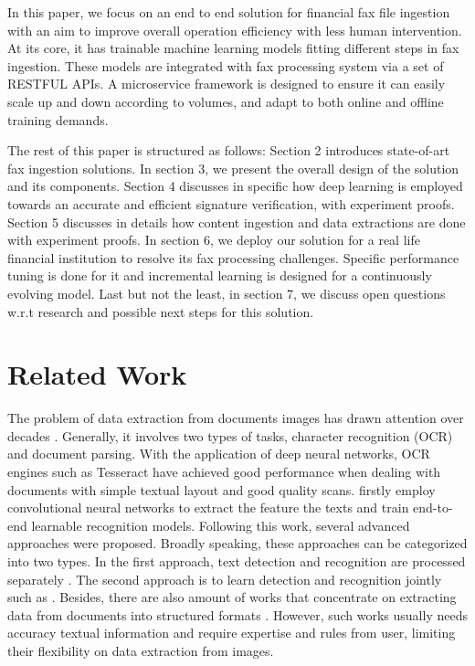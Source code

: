 \documentclass[sigconf]{acmart}
\begin{document}
In this paper, we focus on an end to end solution for financial fax file ingestion with an aim to improve overall operation efficiency with less human intervention. At its core, it has trainable machine learning models fitting different steps in fax ingestion. These models are integrated with fax processing system via a set of RESTFUL APIs. A microservice framework is designed to ensure it can easily scale up and down according to volumes, and adapt to both online and offline training demands.
 
The rest of this paper is structured as follows: Section 2 introduces state-of-art fax ingestion solutions. In section 3, we present the overall design of the solution and its components. Section 4 discusses in specific how deep learning is employed towards an accurate and efficient signature verification, with experiment proofs. Section 5 discusses in details how content ingestion and data extractions are done with experiment proofs. In section 6, we deploy our solution for a real life financial institution to resolve its fax processing challenges. Specific performance tuning is done for it and incremental learning is designed for a continuously evolving model. Last but not the least, in section 7, we discuss open questions w.r.t research and possible next steps for this solution.

\section{Related Work}
The problem of data extraction from documents images has drawn attention over decades \cite{nagy2000twenty}. Generally, it involves two types of tasks, character recognition (OCR) and document parsing. With the application of deep neural networks, OCR engines such as Tesseract \cite{smith2007overview} have achieved good performance when dealing with documents with simple textual layout and good quality scans. \cite{jaderberg2014synthetic} firstly employ convolutional neural networks to extract the feature the texts and train end-to-end learnable recognition models. Following this work, several advanced approaches were proposed. Broadly speaking, these approaches can be categorized into two types. In the first approach, text detection and recognition are processed separately \cite{shi2017end, tian2016detecting, he2017deep, lyu2018multi, borisyuk2018rosetta}. The second approach is to learn detection and recognition jointly such as \cite{li2017towards, buvsta2017deep, liu2018fots}. Besides, there are also amount of works that concentrate on extracting data from documents into structured formats \cite{cesarini1998informys, chanod2005legacy, peanho2012semantic, li2016precomputed}. However, such works usually needs accuracy textual information and require expertise and rules from user, limiting their flexibility on data extraction from images.
\end{document}
